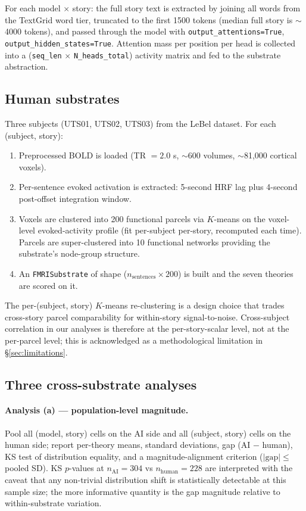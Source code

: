 \documentclass[11pt,a4paper]{article}
\begin{document}
For each model $\times$ story: the full story text is extracted by joining all words from the TextGrid word tier, truncated to the first 1500 tokens (median full story is $\sim$4000 tokens), and passed through the model with \texttt{output\_attentions=True}, \texttt{output\_hidden\_states=True}. Attention mass per position per head is collected into a (\texttt{seq\_len} $\times$ \texttt{N\_heads\_total}) activity matrix and fed to the substrate abstraction.

\subsection{Human substrates}

Three subjects (UTS01, UTS02, UTS03) from the LeBel dataset. For each (subject, story):

\begin{enumerate}
  \item Preprocessed BOLD is loaded (TR $= 2.0$ s, $\sim$600 volumes, $\sim$81{,}000 cortical voxels).
  \item Per-sentence evoked activation is extracted: 5-second HRF lag plus 4-second post-offset integration window.
  \item Voxels are clustered into 200 functional parcels via $K$-means on the voxel-level evoked-activity profile (fit per-subject per-story, recomputed each time). Parcels are super-clustered into 10 functional networks providing the substrate's node-group structure.
  \item An \texttt{FMRISubstrate} of shape ($n_{\mathrm{sentences}} \times 200$) is built and the seven theories are scored on it.
\end{enumerate}

The per-(subject, story) $K$-means re-clustering is a design choice that trades cross-story parcel comparability for within-story signal-to-noise. Cross-subject correlation in our analyses is therefore at the per-story-scalar level, not at the per-parcel level; this is acknowledged as a methodological limitation in \S\ref{sec:limitations}.

\subsection{Three cross-substrate analyses}

\paragraph{Analysis (a) --- population-level magnitude.} Pool all (model, story) cells on the AI side and all (subject, story) cells on the human side; report per-theory means, standard deviations, gap (AI $-$ human), KS test of distribution equality, and a magnitude-alignment criterion ($|\text{gap}| \leq$ pooled SD). KS $p$-values at $n_{\mathrm{AI}} = 304$ vs $n_{\mathrm{human}} = 228$ are interpreted with the caveat that any non-trivial distribution shift is statistically detectable at this sample size; the more informative quantity is the gap magnitude relative to within-substrate variation.
\end{document}
